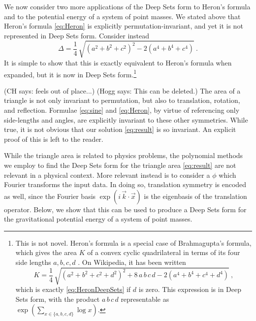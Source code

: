 \documentclass[10pt]{article}
\newcommand{\secbreak}{\bigskip{\centering\footnotesize $\triangle~~~\triangle~~~\triangle$\par}\bigskip\noindent}
\newcommand{\CH}[1]{{\color{blue} (CH says: #1)}}
\newcommand{\Hogg}[1]{{\color{violet} (Hogg says: #1)}}
\begin{document}
\secbreak
We now consider two more applications of the Deep Sets form to Heron's formula and to the potential energy of a system of point masses.
We stated above that Heron's formula \eqref{eq:Heron} is explicitly permutation-invariant, and yet it is not represented in Deep Sets form. Consider instead
\begin{equation}
\label{eq:HeronDeepSets}
    \Delta = \frac{1}{4} \, \sqrt{
        \left( a^2 + b^2 + c^2 \right)^2
        - 2 \left( a^4 + b^4 + c^4 \right)
    }~.
\end{equation}
It is simple to show that this is exactly equivalent to Heron's formula when expanded, but it is now in Deep Sets form.\footnote{
    This is not novel. Heron's formula is a special case of Brahmagupta's formula, which gives the area $K$ of a convex cyclic quadrilateral in terms of its four side lengths $a, b, c, d$ \citep{coolidge1939}.
    On Wikipedia, it has been written
    \begin{equation}
        K = \frac{1}{4} \, \sqrt{
            \left( a^2 + b^2 + c^2 + d^2 \right)^2
            + 8 \, a\,b\,c\,d
            - 2 \left( a^4 + b^4 + c^4 + d^4 \right)
        }~,
    \end{equation}
    which is exactly \eqref{eq:HeronDeepSets} if $d$ is zero.
    This expression is in Deep Sets form, with the product $a \, b \, c \, d$ 
    representable as $\exp( \sum_{x \in \{ a,b,c,d \}} \log x )$.
}

\CH{feels out of place...} \Hogg{This can be deleted.}
The area of a triangle is not only invariant to permutation, but also to translation, rotation, and reflection.
Formulae \eqref{eq:sine} and \eqref{eq:Heron}, by virtue of referencing only side-lengths and angles, are explicitly invariant to these other symmetries.
While true, it is not obvious that our solution \eqref{eq:result} is so invariant.
An explicit proof of this is left to the reader.

While the triangle area is related to physics problems, the polynomial methods we employ to find the Deep Sets form for the triangle area \eqref{eq:result} are not relevant in a physical context.
More relevant instead is to consider a $\phi$ which Fourier transforms the input data.
In doing so, translation symmetry is encoded as well, since the Fourier basis $\exp (i\, \vec{k}\cdot\vec{x})$ is the eigenbasis of the translation operator.
Below, we show that this can be used to produce a Deep Sets form for the gravitational potential energy of a system of point masses.
\end{document}
